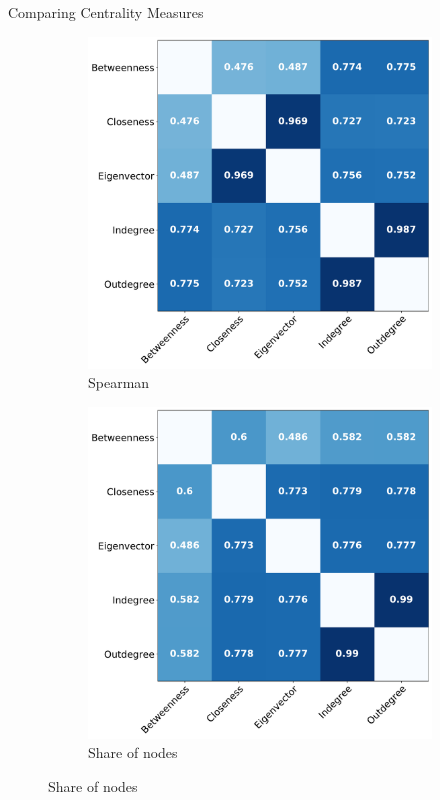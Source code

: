 \documentclass[10pt]{beamer}
\begin{document}
\begin{frame}{Comparing Centrality Measures}
\begin{figure}[!h]
    \begin{subfigure}[t]{0.45\textwidth}
        \centering
        \includegraphics[width=1\textwidth]{Figures/spearman_matrix.pdf}
        \caption{Spearman}
        \label{fig:spearman_matrix}
    \end{subfigure}
    \begin{subfigure}[t]{0.45\textwidth}
        \centering
        \includegraphics[width=1\textwidth]{Figures/node_remove_overlap_matrix.pdf}
        \caption{Share of nodes}
        \label{fig:node_remove_overlap_matrix}
    \end{subfigure}
    \label{fig:measure_comparison}
\end{figure}
\end{frame}
\end{document}
